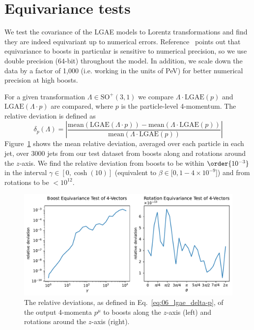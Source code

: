 \section{Equivariance tests}
\label{app:06_lgae_equivariancetests}

We test the covariance of the LGAE models to Lorentz transformations and find they are indeed equivariant up to numerical errors.
Reference~\cite{bogatskiy2020lorentz} points out that equivariance to boosts in particular is sensitive to numerical precision, so we use double precision (64-bit) throughout the model.
In addition, we scale down the data by a factor of 1,000 (i.e. working in the units of PeV) for better numerical precision at high boosts.

For a given transformation $\Lambda \in \mathrm{SO}^+(3,1)$ we compare $\Lambda \cdot \mathrm{LGAE}(p)$ and $ \mathrm{LGAE}(\Lambda \cdot p)$ are compared, where $p$ is the particle-level 4-momentum.
The relative deviation is defined as
\begin{equation} \label{eq:06_lgae_delta-p}
    \delta_p(\Lambda) = \left|\frac{
        \mathrm{mean}(\mathrm{LGAE}(\Lambda \cdot p)) -
        \mathrm{mean}(\Lambda \cdot \mathrm{LGAE}(p))
    }{\mathrm{mean}(\Lambda \cdot \mathrm{LGAE}(p))}\right|
\end{equation}
Figure~\ref{fig:06_lgae_equivariance} shows the mean relative deviation, averaged over each particle in each jet, over $3000$ jets from our test dataset from boosts along and rotations around the $z$-axis.
We find the relative deviation from boosts to be within $\order{10^{-3}}$ in the interval $\gamma \in [0, \cosh(10)]$ (equivalent to $\beta \in [0, 1 - 4\times10^{-9}$]) and from rotations to be $<10^{12}$.

\begin{figure}[ht]
    \centering
    \includegraphics[width=\linewidth]{figures/06-ML4Jets/lgae/covariance/equivariance-p4.pdf}
    \caption{The relative deviations, as defined in Eq.~\ref{eq:06_lgae_delta-p}, of the output 4-momenta $p^\mu$ to boosts along the $z$-axis (left) and rotations around the $z$-axis (right).}
    \label{fig:06_lgae_equivariance}
\end{figure}
